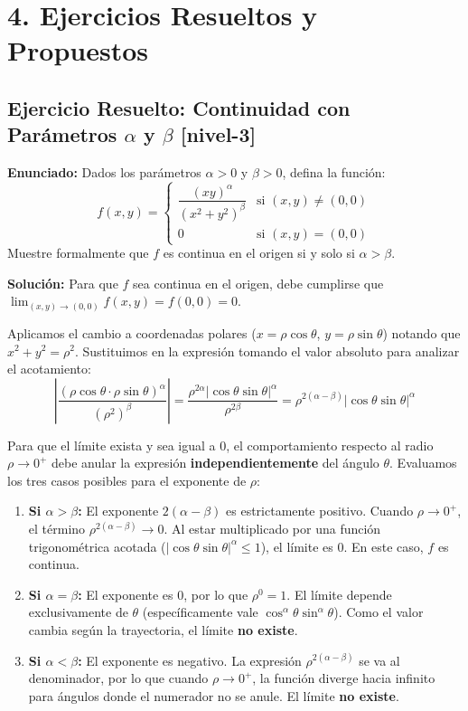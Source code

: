 \documentclass[11pt]{article}
\newenvironment{ejercicios}{%
  \section*{4. Ejercicios Resueltos y Propuestos}%
}{}
\newenvironment{ejercicioresuelto}[2]{\subsection*{Ejercicio Resuelto: #1 \small{[#2]}}}{}
\newcommand{\enunciado}[1]{\textbf{Enunciado:} #1\par\vspace{0.2cm}}
\newcommand{\solucion}[1]{\textbf{Solución:} #1\par\vspace{0.4cm}}
\begin{document}
\begin{ejercicios}

  \begin{ejercicioresuelto}{Continuidad con Parámetros $\alpha$ y $\beta$}{nivel-3}
    \enunciado{
      Dados los parámetros $\alpha > 0$ y $\beta > 0$, defina la función:
      $$ f(x,y) = \begin{cases} \dfrac{(xy)^\alpha}{(x^2+y^2)^\beta} & \text{si } (x,y) \neq (0,0) \\[0.5em] 0 & \text{si } (x,y) = (0,0) \end{cases} $$
      Muestre formalmente que $f$ es continua en el origen si y solo si $\alpha > \beta$.
    }
    \solucion{
      Para que $f$ sea continua en el origen, debe cumplirse que $\displaystyle \lim_{(x,y)\to(0,0)} f(x,y) = f(0,0) = 0$.
      
      Aplicamos el cambio a coordenadas polares ($x = \rho\cos\theta$, $y = \rho\sin\theta$) notando que $x^2+y^2 = \rho^2$. 
      Sustituimos en la expresión tomando el valor absoluto para analizar el acotamiento:
      $$ \left| \dfrac{(\rho\cos\theta \cdot \rho\sin\theta)^\alpha}{(\rho^2)^\beta} \right| = \dfrac{\rho^{2\alpha} |\cos\theta\sin\theta|^\alpha}{\rho^{2\beta}} = \rho^{2(\alpha-\beta)} |\cos\theta\sin\theta|^\alpha $$
      
      Para que el límite exista y sea igual a $0$, el comportamiento respecto al radio $\rho \to 0^+$ debe anular la expresión \textbf{independientemente} del ángulo $\theta$. Evaluamos los tres casos posibles para el exponente de $\rho$:
      
      \begin{enumerate}
        \item \textbf{Si $\alpha > \beta$:} El exponente $2(\alpha-\beta)$ es estrictamente positivo. Cuando $\rho \to 0^+$, el término $\rho^{2(\alpha-\beta)} \to 0$. Al estar multiplicado por una función trigonométrica acotada ($|\cos\theta\sin\theta|^\alpha \leq 1$), el límite es $0$. En este caso, $f$ es continua.
        \item \textbf{Si $\alpha = \beta$:} El exponente es $0$, por lo que $\rho^0 = 1$. El límite depende exclusivamente de $\theta$ (específicamente vale $\cos^\alpha\theta \sin^\alpha\theta$). Como el valor cambia según la trayectoria, el límite \textbf{no existe}.
        \item \textbf{Si $\alpha < \beta$:} El exponente es negativo. La expresión $\rho^{2(\alpha-\beta)}$ se va al denominador, por lo que cuando $\rho \to 0^+$, la función diverge hacia infinito para ángulos donde el numerador no se anule. El límite \textbf{no existe}.
      \end{enumerate}
      
}
\end{ejercicioresuelto}
\end{ejercicios}
\end{document}
